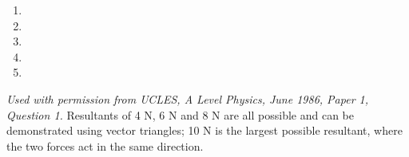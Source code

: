 
\begin{problem}[A1986PIQ1l]
{ 
\begin{enumerate}
	\item {}\correct
	\item {}
	\item {}
	\item {}
	\item {}
\end{enumerate}
}
{\textit{Used with permission from UCLES, A Level Physics, June 1986, Paper 1, Question 1.}}
{ Resultants of 4 N, 6 N and 8 N are all possible and can be demonstrated using vector triangles; 10 N is the largest possible resultant, where the two forces act in the same direction.
}
\end{problem}